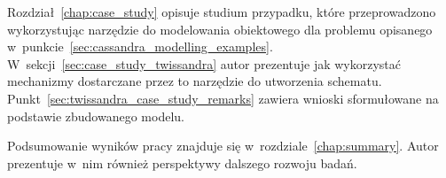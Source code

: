 Rozdział~\ref{chap:case_study} opisuje studium przypadku, które przeprowadzono wykorzystując narzędzie do modelowania obiektowego dla problemu opisanego w~punkcie~\ref{sec:cassandra_modelling_examples}. W~sekcji~\ref{sec:case_study_twissandra} autor prezentuje jak wykorzystać mechanizmy dostarczane przez to narzędzie do utworzenia schematu. Punkt~\ref{sec:twissandra_case_study_remarks} zawiera wnioski sformułowane na podstawie zbudowanego modelu. 

Podsumowanie wyników pracy znajduje się w~rozdziale~\ref{chap:summary}. Autor prezentuje w~nim również perspektywy dalszego rozwoju badań. 